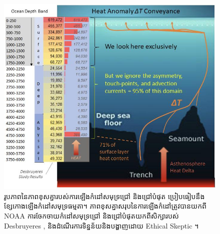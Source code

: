 \documentclass[10pt,twocolumn,letterpaper]{article}
\begin{document}
\begin{figure}[t]
\begin{center}
\includegraphics[width=1\textwidth]{deepsea.jpg}
\end{center}
   \caption{រូបភាពនៃភាពខុសគ្នា​របស់ការឡើងកំដៅសមុទ្រជ្រៅ និងជ្រៅបំផុត ប្រៀបធៀប​នឹងខ្សែកោងឡើងកំដៅសមុទ្រធម្មតា។ ភាពខុសគ្នាសរុបនៃការឡើងកំដៅត្រូវបានយកពី NOAA \cite{147} ការចែកចាយកំដៅសមុទ្រជ្រៅ និងជ្រៅបំផុតយកពីសិក្សា​របស់ Desbruyeres \cite{132}, និងដំណើរការទិន្នន័យនិងបង្ហាញដោយ Ethical Skeptic \cite{129}។}
\label{fig:21}
\end{figure}
\end{document}
